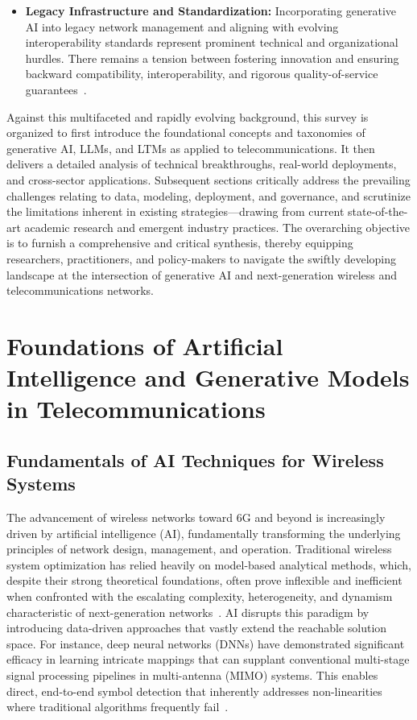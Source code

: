 \documentclass[sigconf]{acmart}
\begin{document}
\begin{itemize}
    \item \textbf{Legacy Infrastructure and Standardization:} Incorporating generative AI into legacy network management and aligning with evolving interoperability standards represent prominent technical and organizational hurdles. There remains a tension between fostering innovation and ensuring backward compatibility, interoperability, and rigorous quality-of-service guarantees~\cite{ref25, ref39, ref40, ref46}.
\end{itemize}

Against this multifaceted and rapidly evolving background, this survey is organized to first introduce the foundational concepts and taxonomies of generative AI, LLMs, and LTMs as applied to telecommunications. It then delivers a detailed analysis of technical breakthroughs, real-world deployments, and cross-sector applications. Subsequent sections critically address the prevailing challenges relating to data, modeling, deployment, and governance, and scrutinize the limitations inherent in existing strategies—drawing from current state-of-the-art academic research and emergent industry practices. The overarching objective is to furnish a comprehensive and critical synthesis, thereby equipping researchers, practitioners, and policy-makers to navigate the swiftly developing landscape at the intersection of generative AI and next-generation wireless and telecommunications networks.

\section{Foundations of Artificial Intelligence and Generative Models in Telecommunications}

\subsection{Fundamentals of AI Techniques for Wireless Systems}

The advancement of wireless networks toward 6G and beyond is increasingly driven by artificial intelligence (AI), fundamentally transforming the underlying principles of network design, management, and operation. Traditional wireless system optimization has relied heavily on model-based analytical methods, which, despite their strong theoretical foundations, often prove inflexible and inefficient when confronted with the escalating complexity, heterogeneity, and dynamism characteristic of next-generation networks~\cite{ref46}. AI disrupts this paradigm by introducing data-driven approaches that vastly extend the reachable solution space. For instance, deep neural networks (DNNs) have demonstrated significant efficacy in learning intricate mappings that can supplant conventional multi-stage signal processing pipelines in multi-antenna (MIMO) systems. This enables direct, end-to-end symbol detection that inherently addresses non-linearities where traditional algorithms frequently fail~\cite{ref43}. 
\end{document}

